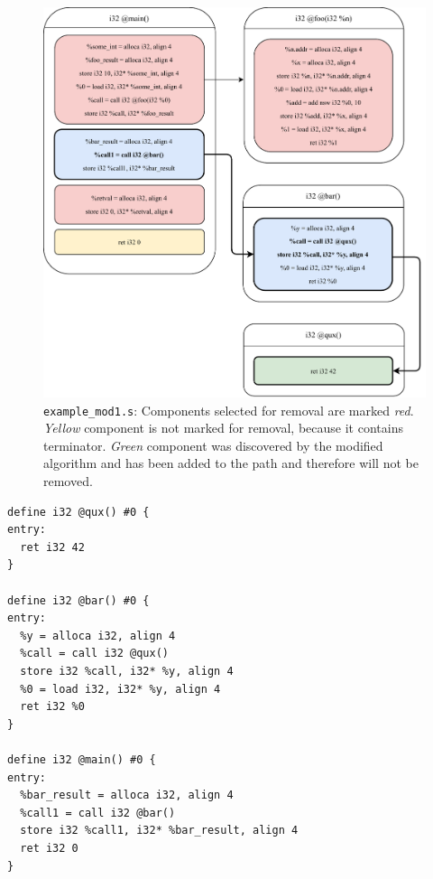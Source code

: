 \documentclass[12pt, twoside]{fithesis2}
\renewcommand{\_}{\leavevmode \kern0.07em\vbox{\hrule width0.4em}}
\begin{document}
\begin{figure}[ht]
    \centering
    \includegraphics[]{images/example_mod1/example_mod1_removing_prepare.pdf}
    \caption{
    \texttt{example_mod1.s}:
    Components selected for removal are marked \emph{red}.
    \emph{Yellow} component is not marked for removal, because it contains
    terminator. \emph{Green} component was discovered by the modified algorithm
    and has been added to the path and therefore will not be removed.
    }
    \label{fig:mod1_prepare}
\end{figure}

\begin{verbatim}
define i32 @qux() #0 {
entry:
  ret i32 42
}

define i32 @bar() #0 {
entry:
  %y = alloca i32, align 4
  %call = call i32 @qux()
  store i32 %call, i32* %y, align 4
  %0 = load i32, i32* %y, align 4
  ret i32 %0
}

define i32 @main() #0 {
entry:
  %bar_result = alloca i32, align 4
  %call1 = call i32 @bar()
  store i32 %call1, i32* %bar_result, align 4
  ret i32 0
}
\end{verbatim}
\end{document}
